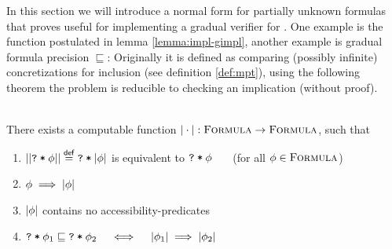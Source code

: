 In this section we will introduce a normal form for partially unknown formulas that proves useful for implementing a gradual verifier for \gvlidf.
One example is the function postulated in lemma \ref{lemma:impl-gimpl}, another example is gradual formula precision $\sqsubseteq$:
Originally it is defined as comparing (possibly infinite) concretizations for inclusion (see definition \ref{def:mpt}), using the following theorem the problem is reducible to checking an implication (without proof).

\begin{theorem}\label{thm:gnf}~\\
    There exists a computable function $|\cdot| : \textup{\textsc{Formula}} \rightarrow \textup{\textsc{Formula}}$, such that
    \begin{enumerate}
        \item $||\textup{\texttt{\textup{\texttt{?}}\:*\:\ensuremath{\phi}}}|| \overset{\textup{\textmd{\textsf{def}}}}{=} \textup{\texttt{\textup{\texttt{?}}\:*\:\ensuremath{|\phi|}}}$ is equivalent to $\textup{\texttt{\textup{\texttt{?}}\:*\:\ensuremath{\phi}}}$ ~~~(for all $\phi \in \textup{\textsc{Formula}}$)
        \item $\phi \implies |\phi|$
        \item $|\phi|$ contains no accessibility-predicates
        \item $\textup{\texttt{\textup{\texttt{?}}\:*\:\ensuremath{\phi_1}}} \sqsubseteq \textup{\texttt{\textup{\texttt{?}}\:*\:\ensuremath{\phi_2}}}  \quad\iff\quad  |\phi_1| \implies |\phi_2|$
    \end{enumerate}
\end{theorem}

